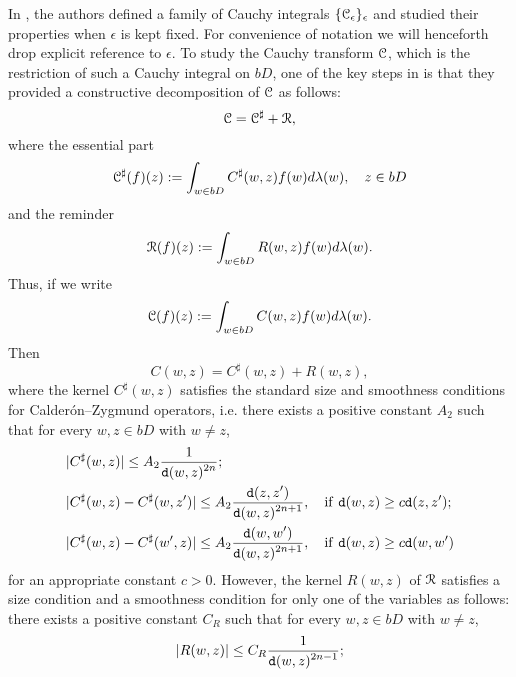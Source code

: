 \documentclass[11pt,a4paper]{amsart}
\numberwithin{equation}{section}
\begin{document}
{In \cite{LS}, the authors defined a family of Cauchy integrals $\{\EuScript C_\epsilon\}_\epsilon$ and studied their properties when $\epsilon$ is kept fixed. For convenience of notation we will henceforth drop explicit reference to $\epsilon$.  To study the Cauchy  transform $\EuScript C$,  which is the restriction of such a Cauchy integral on $bD$,
one of the key steps in  \cite{LS} is that they provided a constructive decomposition of $ \EuScript C$ as follows:
$$   \EuScript C =  \EuScript C^\sharp+ \EuScript R,  $$
where the essential part
\begin{align}
 \EuScript C^\sharp(f) (z) := \int_{w\in bD}  C^\sharp(w,z) f(w) d\lambda(w), \quad z\in bD
\end{align}
and the reminder
$$\EuScript R(f)(z):=\int_{w\in bD}R(w,z)f(w)d\lambda(w).$$
Thus, if we write
$$\EuScript C(f)(z):=\int_{w\in bD}C(w,z)f(w)d\lambda(w).$$
Then
$$C(w,z)=C^\sharp(w,z)+ R(w,z),$$
where the kernel $C^\sharp(w,z)$ satisfies the standard size and smoothness conditions
for Calder\'on--Zygmund operators, i.e. there exists a positive constant $A_2$ such that for every $w,z\in bD$ with $w\not=z$,
\begin{equation}\label{gwz}
\begin{split}
& |C^\sharp(w,z)|\leq A_2 {\displaystyle1\over\displaystyle{\tt d}(w,z)^{2n}};\\
&|C^\sharp(w,z) - C^\sharp(w,z')|\leq A_2  {\displaystyle {\tt d}(z,z')\over \displaystyle {\tt d}(w,z)^{2n+1} },\quad {\rm if}\ {\tt d}(w,z)\geq c {\tt d}(z,z');\\
&|C^\sharp(w,z) - C^\sharp(w',z)|\leq A_2 {\displaystyle {\tt d}(w,w')\over \displaystyle {\tt d}(w,z)^{2n+1} },\quad {\rm if}\ {\tt d}(w,z)\geq c{\tt d}(w,w')
 \end{split}
\end{equation}
for an appropriate constant $c>0$.
 However, the kernel $R(w,z)$ of $\EuScript R$ satisfies a size condition and a smoothness condition for only one of the variables as follows: there exists
a positive constant $C_R$ such that for every $w,z\in bD$ with $w\not=z$,
\begin{equation}\label{cr}
                \begin{split}
&|R(w,z)|\leq C_R {\displaystyle1\over \displaystyle{\tt d}(w,z)^{2n-1}};\\

\end{split}
\end{equation}}
\end{document}
